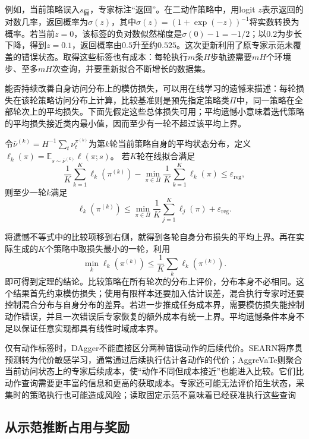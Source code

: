 例如，当前策略误入$s_{\text{偏}}$，专家标注“返回”。在二动作策略中，用logit $z$表示返回的对数几率，返回概率为$\sigma(z)$，其中$\sigma(z)=(1+\exp(-z))^{-1}$将实数转换为概率。若当前$z=0$，该标签的负对数似然梯度是$\sigma(0)-1=-1/2$；以$0.2$为步长下降，得到$z=0.1$，返回概率由$0.5$升至约$0.525$。这次更新利用了原专家示范未覆盖的错误状态。取得这些标签也有成本：每轮执行$m$条$H$步轨迹需要$mH$个环境步、至多$mH$次查询，并要重新拟合不断增长的数据集。

能否持续改善自身访问分布上的模仿损失，可以用在线学习的遗憾来描述：每轮损失在该轮策略访问分布上计算，比较基准则是预先指定策略类$\Pi$中，同一策略在全部轮次上的平均损失。下面先假定这些总体损失可用；平均遗憾小意味着迭代策略的平均损失接近类内最小值，因而至少有一轮不超过该平均上界。

\begin{theorem}[理想化DAgger的无遗憾归约]
  \label{thm:rl-reward-dagger}
  令$\bar\nu^{(k)}=H^{-1}\sum_t\nu_t^{\pi^{(k)}}$为第$k$轮当前策略自身的平均状态分布，定义
  $\ell_k(\pi)=\mathbb E_{s\sim\bar\nu^{(k)}}\ell(\pi;s)$。
  若$K$轮在线拟合满足
  \[
    \frac1K\sum_{k=1}^K\ell_k(\pi^{(k)})
    -\min_{\pi\in\Pi}\frac1K\sum_{k=1}^K\ell_k(\pi)
    \leq\varepsilon_{\mathrm{reg}},
  \]
  则至少一轮$k$满足
  \[
    \ell_k(\pi^{(k)})
    \leq\min_{\pi\in\Pi}\frac1K\sum_{j=1}^K\ell_j(\pi)
        +\varepsilon_{\mathrm{reg}}.
  \]
\end{theorem}

将遗憾不等式中的比较项移到右侧，就得到各轮自身分布损失的平均上界。再在实际生成的$K$个策略中取损失最小的一轮，利用
\[
  \min_k\ell_k(\pi^{(k)})
  \leq\frac1K\sum_k\ell_k(\pi^{(k)}).
\]
即可得到定理的结论。比较策略在所有轮次的分布上评价，分布本身不必相同。这个结果首先约束模仿损失；使用有限样本还要加入估计误差，混合执行专家时还要控制混合分布与自身分布的差异。若进一步推成任务成本界，需要模仿损失能控制动作错误，并且一次错误后专家恢复的额外成本有统一上界。平均遗憾条件本身不足以保证任意实现都具有线性时域成本界。

仅有动作标签时，DAgger不能直接区分两种错误动作的后续代价。SEARN将序贯预测转为代价敏感学习，通常通过后续执行估计各动作的代价；AggreVaTe则聚合当前访问状态上的专家后续成本，使“动作不同但成本接近”也能进入比较。它们比动作查询需要更丰富的信息和更高的获取成本。专家还可能无法评价陌生状态，采集时的策略执行也可能造成风险；读取固定示范不意味着已经获准执行这些查询

\subsection{从示范推断占用与奖励}
\label{sec:rl-reward-occupancy-irl}

